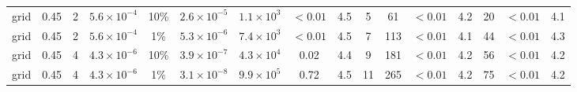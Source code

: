 \begin{table}[t]
\begin{ruledtabular}
\begin{tabular}{lcccc|cccc|cccc|ccc}
grid & 0.45 & 2 & $5.6\times10^{-4}$ & 10\% & $2.6\times10^{-5}$ & $1.1\times10^{3}$ & $<0.01$ & 4.5 & 5 & 61 & $<0.01$ & 4.2 & 20 & $<0.01$ & 4.1 \\
grid & 0.45 & 2 & $5.6\times10^{-4}$ & 1\% & $5.3\times10^{-6}$ & $7.4\times10^{3}$ & $<0.01$ & 4.5 & 7 & 113 & $<0.01$ & 4.1 & 44 & $<0.01$ & 4.3 \\
grid & 0.45 & 4 & $4.3\times10^{-6}$ & 10\% & $3.9\times10^{-7}$ & $4.3\times10^{4}$ & 0.02 & 4.4 & 9 & 181 & $<0.01$ & 4.2 & 56 & $<0.01$ & 4.2 \\
grid & 0.45 & 4 & $4.3\times10^{-6}$ & 1\% & $3.1\times10^{-8}$ & $9.9\times10^{5}$ & 0.72 & 4.5 & 11 & 265 & $<0.01$ & 4.2 & 75 & $<0.01$ & 4.2 \\
\end{tabular}
\end{ruledtabular}
\end{table}
